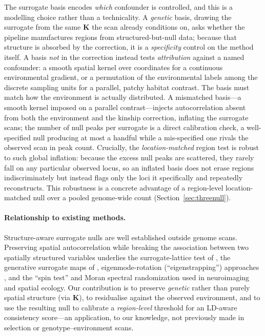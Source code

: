 \documentclass[11pt]{article}
\begin{document}
The surrogate basis encodes \emph{which} confounder is controlled, and this is a
modelling choice rather than a technicality. A \emph{genetic} basis, drawing the
surrogate from the same $\mathbf{K}$ the scan already conditions on, asks whether
the pipeline manufactures regions from structured-but-null data; because that
structure is absorbed by the correction, it is a \emph{specificity} control on the
method itself. A basis \emph{not} in the correction instead tests
\emph{attribution} against a named confounder: a smooth spatial kernel over
coordinates for a continuous environmental gradient, or a permutation of the
environmental labels among the discrete sampling units for a parallel, patchy
habitat contrast. The basis must match how the environment is actually
distributed. A mismatched basis---a smooth kernel imposed on a parallel
contrast---injects autocorrelation absent from both the environment and the
kinship correction, inflating the surrogate scans; the number of null peaks per
surrogate is a direct calibration check, a well-specified null producing at most a
handful while a mis-specified one rivals the observed scan in peak count. Crucially,
the \emph{location-matched} region test is robust to such global inflation: because
the excess null peaks are scattered, they rarely fall on any particular observed
locus, so an inflated basis does not erase regions indiscriminately but instead
flags only the loci it specifically and repeatedly reconstructs. This robustness is
a concrete advantage of a region-level location-matched null over a pooled
genome-wide count (Section~\ref{sec:threenull}).

\paragraph{Relationship to existing methods.}
Structure-aware surrogate nulls are well established outside genome scans.
Preserving spatial autocorrelation while breaking the association between two
spatially structured variables underlies the surrogate-lattice test of
\citet{deblauwe2012testing}, the generative surrogate maps of
\citet{burt2020generative}, eigenmode-rotation (``eigenstrapping'') approaches
\citep{eigenstrapping2024}, and the ``spin test'' \citep{alexanderbloch2018testing}
and Moran spectral randomization \citep{wagner2015generating} used in
neuroimaging and spatial ecology. Our contribution is to preserve \emph{genetic}
rather than purely spatial structure (via $\mathbf{K}$), to residualise against
the observed environment, and to use the resulting null to calibrate a
\emph{region-level} threshold for an LD-aware consistency score---an application,
to our knowledge, not previously made in selection or genotype--environment
scans.
\end{document}
